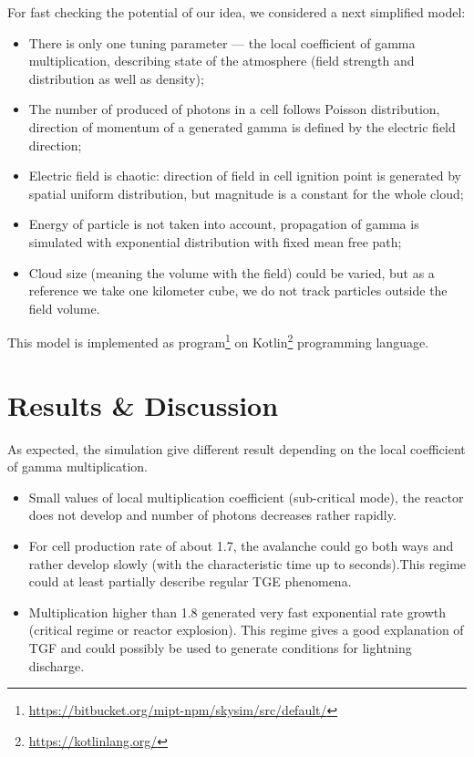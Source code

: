 \documentclass[%
 aip,
cp,  %
 amsmath,amssymb,%
 reprint,%
]{revtex4-2}
\begin{document}
For fast checking the potential of our idea, we considered a next simplified model:  
\begin{itemize}
	\item There is only one tuning parameter --- the local coefficient of gamma multiplication, describing state of the atmosphere (field strength and distribution as well as density);
	\item The number of produced of photons in a cell follows Poisson distribution, direction of momentum of a generated gamma is defined by the electric field direction;
	\item Electric field is chaotic: direction of field in cell ignition point is generated by spatial uniform distribution, but magnitude is a constant for the whole cloud;
	\item Energy of particle is not taken into account, propagation of gamma is simulated with exponential distribution with fixed mean free path;
	\item Cloud size (meaning the volume with the field) could be varied, but as a reference we take one kilometer cube, we do not track particles outside the field volume. 
\end{itemize}
This model is implemented as program\footnote{\url{https://bitbucket.org/mipt-npm/skysim/src/default/}}  on Kotlin\footnote{\url{https://kotlinlang.org/}} programming language. 

\section{Results \& Discussion}

As expected, the simulation give different result depending on the local coefficient of gamma multiplication. 
\begin{itemize}
    \item Small values of local multiplication coefficient (sub-critical mode), the reactor does not develop and number of photons decreases rather rapidly.
    \item For cell production rate of about 1.7, the avalanche could go both ways and rather develop slowly (with the characteristic time up to seconds).This regime could at least partially describe regular TGE phenomena.
    \item Multiplication higher than 1.8 generated very fast exponential rate growth (critical regime or reactor explosion). This regime gives a good explanation of TGF and could possibly be used to generate conditions for lightning discharge.
\end{itemize}
\end{document}
